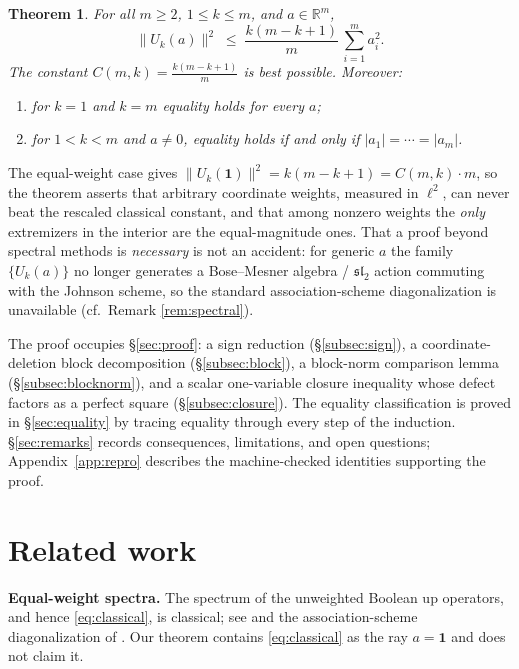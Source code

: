 \documentclass[11pt]{article}
\newtheorem{theorem}{Theorem}
\theoremstyle{remark}
\begin{document}
\begin{theorem}\label{thm:main}
For all $m\ge2$, $1\le k\le m$, and $a\in\mathbb{R}^m$,
\[
\|U_k(a)\|^2\;\le\;\frac{k(m-k+1)}{m}\,\sum_{i=1}^m a_i^2 .
\]
The constant $C(m,k)=\frac{k(m-k+1)}{m}$ is best possible. Moreover:
\begin{enumerate}
\item[(i)] for $k=1$ and $k=m$ equality holds for every $a$;
\item[(ii)] for $1<k<m$ and $a\ne0$, equality holds if and only if
$|a_1|=\cdots=|a_m|$.
\end{enumerate}
\end{theorem}

The equal-weight case gives $\|U_k(\mathbf 1)\|^2=k(m-k+1)=C(m,k)\cdot m$,
so the theorem asserts that arbitrary coordinate weights, measured in
$\ell^2$, can never beat the rescaled classical constant, and that among
nonzero weights the \emph{only} extremizers in the interior are the
equal-magnitude ones. That a proof beyond spectral methods is
\emph{necessary} is not an accident: for generic $a$ the family
$\{U_k(a)\}$ no longer generates a Bose--Mesner algebra /
$\mathfrak{sl}_2$ action commuting with the Johnson scheme, so the standard
association-scheme diagonalization is unavailable (cf.\ Remark
\ref{rem:spectral}).

The proof occupies \S\ref{sec:proof}: a sign reduction (\S\ref{subsec:sign}),
a coordinate-deletion block decomposition (\S\ref{subsec:block}), a
block-norm comparison lemma (\S\ref{subsec:blocknorm}), and a scalar
one-variable closure inequality whose defect factors as a perfect square
(\S\ref{subsec:closure}). The equality classification is proved in
\S\ref{sec:equality} by tracing equality through every step of the
induction. \S\ref{sec:remarks} records consequences, limitations, and open
questions; Appendix~\ref{app:repro} describes the machine-checked
identities supporting the proof.

\section{Related work}\label{sec:related}

\textbf{Equal-weight spectra.} The spectrum of the unweighted Boolean up
operators, and hence \eqref{eq:classical}, is classical; see
\cite{srinivasan2011} and the association-scheme diagonalization of
\cite{bannai1984}. Our theorem contains \eqref{eq:classical} as the ray
$a=\mathbf 1$ and does not claim it.
\end{document}
